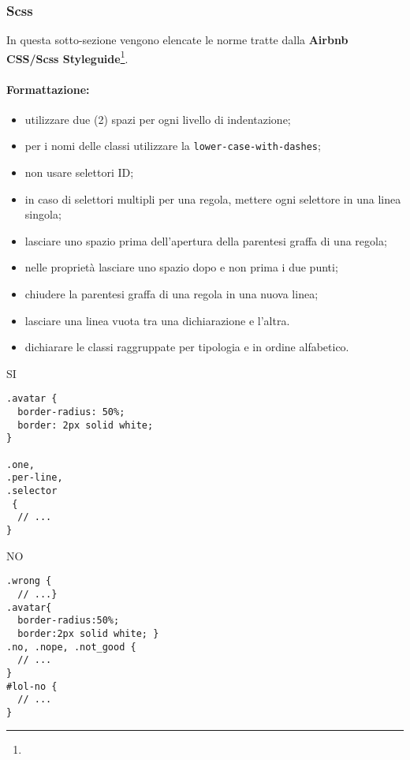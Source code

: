 \documentclass[../ProcessiPrimari.tex]{subfiles}
\begin{document}
	
\subsubsection{Scss}
In questa sotto-sezione vengono elencate le norme tratte dalla \textbf{Airbnb\\ CSS/Scss Styleguide}\footnote{}.
\paragraph*{Formattazione:}
\begin{itemize}
	\item utilizzare due (2) spazi per ogni livello di indentazione;
	\item per i nomi delle classi utilizzare la \texttt{lower-case-with-dashes};
	\item non usare selettori ID;
	\item in caso di selettori multipli per una regola, mettere ogni selettore in una linea singola;
	\item lasciare uno spazio prima dell'apertura della parentesi graffa di una regola;
	\item nelle proprietà lasciare uno spazio dopo e non prima i due punti;
	\item chiudere la parentesi graffa di una regola in una nuova linea;
	\item lasciare una linea vuota tra una dichiarazione e l'altra.
	\item dichiarare le classi raggruppate per tipologia e in ordine alfabetico.
\end{itemize}
\begin{center}{
\begin{minipage}{6cm}
{\begin{center}SI\end{center}}
\begin{Verbatim}[frame=single]
.avatar {
  border-radius: 50%;
  border: 2px solid white;
}

.one,
.per-line,
.selector
 {
  // ...
}
\end{Verbatim}
\end{minipage}
\hfil
\begin{minipage}{7cm}
{\begin{center}NO\end{center}}
\begin{Verbatim}[frame=single]
.wrong {
  // ...}
.avatar{
  border-radius:50%;
  border:2px solid white; }
.no, .nope, .not_good {
  // ...
}
#lol-no {
  // ...
}

\end{Verbatim}
\end{minipage}
}
\end{center}
\end{document}
